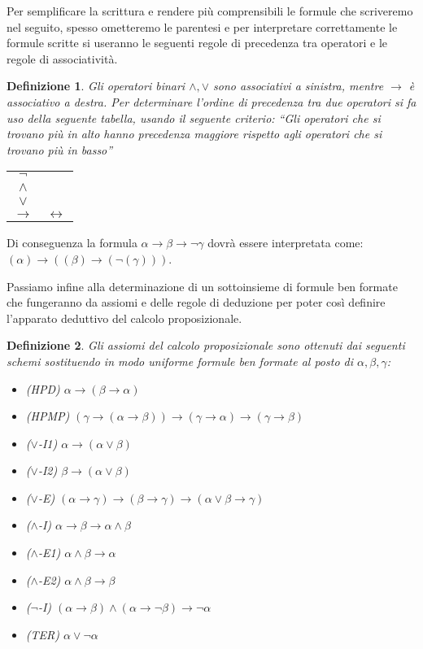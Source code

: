 \documentclass[a4paper, 12pt]{article}
\newtheorem{definition}{Definizione}
\begin{document}
Per semplificare la scrittura e rendere più comprensibili le formule che scriveremo
nel seguito, spesso ometteremo le parentesi e per interpretare correttamente
le formule scritte si useranno le seguenti regole di precedenza tra operatori
e le regole di associatività.

\begin{definition}
Gli operatori binari $\wedge,\vee$ sono associativi a sinistra,
mentre $\rightarrow$ è associativo a destra.
Per determinare l'ordine di precedenza tra due operatori si fa uso della
seguente tabella, usando il seguente criterio:
``Gli operatori che si trovano più in alto hanno precedenza maggiore rispetto
agli operatori che si trovano più in basso''
\begin{center}
\begin{tabular} {c c}
    $\neg$ \\
    $\wedge$ \\
    $\vee$ \\
    $\rightarrow$ & $\leftrightarrow$
\end{tabular}
\end{center}
\end{definition}

Di conseguenza la formula $\alpha \rightarrow \beta \rightarrow \neg \gamma$
dovrà essere interpretata come:
$(\alpha) \rightarrow ((\beta) \rightarrow (\neg (\gamma)))$.

Passiamo infine alla determinazione di un sottoinsieme di formule ben formate
che fungeranno da assiomi e delle regole di deduzione
per poter così definire l'apparato deduttivo del calcolo proposizionale.

\begin{definition}
Gli assiomi del calcolo proposizionale sono ottenuti dai seguenti schemi
sostituendo in modo uniforme formule ben formate al posto di $\alpha, \beta, \gamma$:
\begin{itemize}
\item (HPD) $\alpha \rightarrow (\beta \rightarrow \alpha)$
\item (HPMP) $(\gamma \rightarrow (\alpha \rightarrow \beta)) \rightarrow (\gamma \rightarrow \alpha) \rightarrow (\gamma \rightarrow \beta)$
\item ($\vee$-I1) $\alpha \rightarrow (\alpha \vee \beta)$
\item ($\vee$-I2) $\beta \rightarrow (\alpha \vee \beta)$
\item ($\vee$-E) $(\alpha \rightarrow \gamma) \rightarrow (\beta \rightarrow \gamma) \rightarrow (\alpha \vee \beta \rightarrow \gamma)$
\item ($\wedge$-I) $\alpha \rightarrow \beta \rightarrow \alpha \wedge \beta$
\item ($\wedge$-E1) $\alpha \wedge \beta \rightarrow \alpha$
\item ($\wedge$-E2) $\alpha \wedge \beta \rightarrow \beta$
\item ($\neg$-I) $(\alpha \rightarrow \beta) \wedge (\alpha \rightarrow \neg \beta) \rightarrow \neg \alpha$
\item (TER) $\alpha \vee \neg \alpha$
\end{itemize}
\end{definition}
\end{document}
